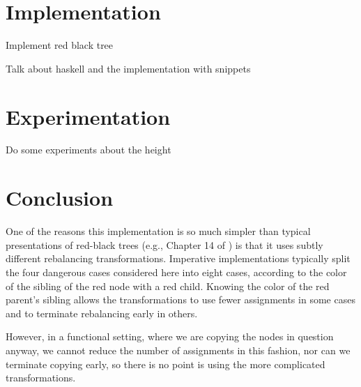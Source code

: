 \documentclass[12pt, a4paper]{article} %
\begin{document}
\section{Implementation}\label{s:implementation}

Implement red black tree

Talk about haskell and the implementation with snippets

\section{Experimentation}\label{s:experimentation}

Do some experiments about the height

\section{Conclusion}\label{s:conclusion}

One of the reasons this implementation is so much  simpler than typical presentations of red-black trees (e.g., Chapter 14 of \cite{clr90}) is that it uses subtly different  rebalancing  transformations.  Imperative implementations typically split the four dangerous cases considered here into eight cases, according to the color  of the sibling  of the red node with a red child.  Knowing the color of the red parent's  sibling allows the transformations  to use fewer  assignments in some cases and to terminate rebalancing early in others.

However, in a functional setting, where we are copying the nodes in question  anyway, we cannot reduce the number  of assignments in this fashion, nor can we terminate copying early, so there is no point is using the more complicated transformations.




\end{document}
